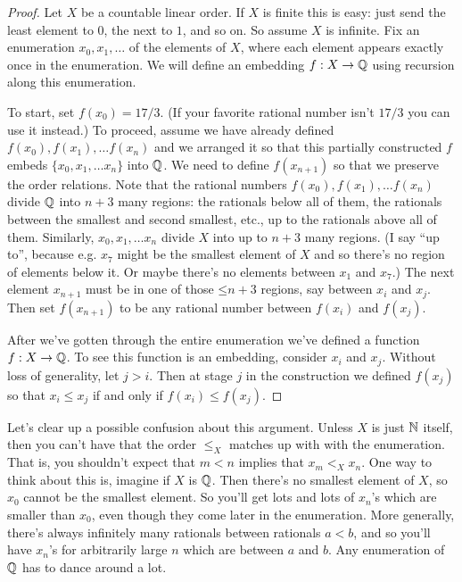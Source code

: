 \documentclass[10pt]{amsart}
\begin{document}
\begin{proof}
Let $X$ be a countable linear order. If $X$ is finite this is easy: just send the least element to $0$, the next to $1$, and so on. So assume $X$ is infinite. Fix an enumeration $x_0, x_1, \ldots$ of the elements of $X$, where each element appears exactly once in the enumeration. We will define an embedding $f : X \to \mathbb{Q}$ using recursion along this enumeration. 

To start, set $f(x_0) = 17/3$. (If your favorite rational number isn't $17/3$ you can use it instead.) To proceed, assume we have already defined $f(x_0), f(x_1), \ldots f(x_n)$ and we arranged it so that this partially constructed $f$ embeds $\{x_0, x_1,\ldots x_n\}$ into $\mathbb{Q}$. We need to define $f(x_{n+1})$ so that we preserve the order relations. Note that the rational numbers $f(x_0), f(x_1), \ldots f(x_n)$ divide $\mathbb{Q}$ into $n+3$ many regions: the rationals below all of them, the rationals between the smallest and second smallest, etc., up to the rationals above all of them. Similarly, $x_0, x_1, \ldots x_n$ divide $X$ into up to $n+3$ many regions. (I say ``up to'', because e.g. $x_7$ might be the smallest element of $X$ and so there's no region of elements below it. Or maybe there's no elements between $x_1$ and $x_7$.) The next element $x_{n+1}$ must be in one of those $\mathord{\le}n+3$ regions, say between $x_i$ and $x_j$. Then set $f(x_{n+1})$ to be any rational number between $f(x_i)$ and $f(x_j)$. 

After we've gotten through the entire enumeration we've defined a function $f : X \to \mathbb{Q}$. To see this function is an embedding, consider $x_i$ and $x_j$. Without loss of generality, let $j > i$. Then at stage $j$ in the construction we defined $f(x_j)$ so that $x_i \le x_j$ if and only if $f(x_i) \le f(x_j)$. 
\end{proof}

Let's clear up a possible confusion about this argument. Unless $X$ is just $\mathbb{N}$ itself, then you can't have that the order $\le_X$ matches up with with the enumeration. That is, you shouldn't expect that $m < n$ implies that $x_m <_X x_n$. One way to think about this is, imagine if $X$ is $\mathbb{Q}$. Then there's no smallest element of $X$, so $x_0$ cannot be the smallest element. So you'll get lots and lots of $x_n$'s which are smaller than $x_0$, even though they come later in the enumeration. More generally, there's always infinitely many rationals between rationals $a < b$, and so you'll have $x_n$'s for arbitrarily large $n$ which are between $a$ and $b$. Any enumeration of $\mathbb{Q}$ has to dance around a lot.
\end{document}
